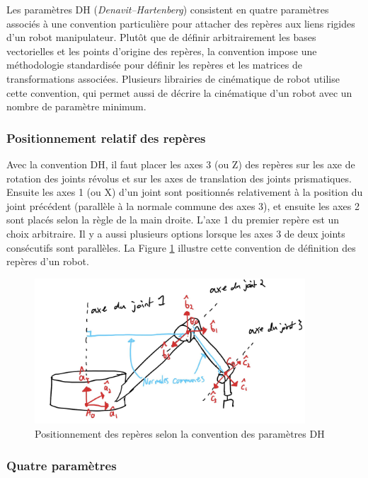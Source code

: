 Les paramètres DH (\textit{Denavit–Hartenberg}) consistent en quatre paramètres associés à une convention particulière pour attacher des repères aux liens rigides d'un robot manipulateur. Plutôt que de définir arbitrairement les bases vectorielles et les points d'origine des repères, la convention impose une méthodologie standardisée pour définir les repères et les matrices de transformations associées. Plusieurs librairies de cinématique de robot utilise cette convention, qui permet aussi de décrire la cinématique d'un robot avec un nombre de paramètre minimum.

\subsubsection{ Positionnement relatif des repères }

Avec la convention DH, il faut placer les axes 3 (ou Z) des repères sur les axe de rotation des joints révolus et sur les axes de translation des joints prismatiques. Ensuite les axes 1 (ou X) d'un joint sont positionnés relativement à la position du joint précédent (parallèle à la normale commune des axes 3), et ensuite les axes 2 sont placés selon la règle de la main droite. L'axe 1 du premier repère est un choix arbitraire. Il y a aussi plusieurs options lorsque les axes 3 de deux joints consécutifs sont parallèles. La Figure \ref{fig:dh1} illustre cette convention de définition des repères d'un robot.
\begin{figure}[H]
	\centering
		\includegraphics[width=0.90\textwidth]{fig/dh1.jpg}
	\caption{Positionnement des repères selon la convention des paramètres DH}
	\label{fig:dh1}
\end{figure}

\subsubsection{ Quatre paramètres }

